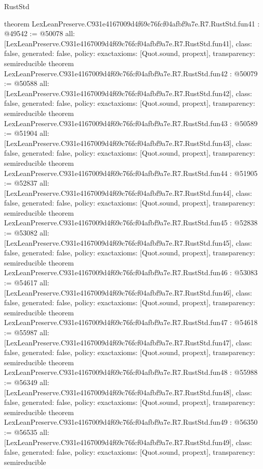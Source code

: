 \begin{lexlean}{RustStd}
\begin{coremodule}
{}
theorem LexLeanPreserve.C931e4167009d4f69c76fcf04afbf9a7e.R7.RustStd.fun41 : @49542 := @50078 {
  all: [LexLeanPreserve.C931e4167009d4f69c76fcf04afbf9a7e.R7.RustStd.fun41],
  class: false,
  generated: false,
  policy: exact{axioms: [Quot.sound, propext]},
  transparency: semireducible
}
theorem LexLeanPreserve.C931e4167009d4f69c76fcf04afbf9a7e.R7.RustStd.fun42 : @50079 := @50588 {
  all: [LexLeanPreserve.C931e4167009d4f69c76fcf04afbf9a7e.R7.RustStd.fun42],
  class: false,
  generated: false,
  policy: exact{axioms: [Quot.sound, propext]},
  transparency: semireducible
}
theorem LexLeanPreserve.C931e4167009d4f69c76fcf04afbf9a7e.R7.RustStd.fun43 : @50589 := @51904 {
  all: [LexLeanPreserve.C931e4167009d4f69c76fcf04afbf9a7e.R7.RustStd.fun43],
  class: false,
  generated: false,
  policy: exact{axioms: [Quot.sound, propext]},
  transparency: semireducible
}
theorem LexLeanPreserve.C931e4167009d4f69c76fcf04afbf9a7e.R7.RustStd.fun44 : @51905 := @52837 {
  all: [LexLeanPreserve.C931e4167009d4f69c76fcf04afbf9a7e.R7.RustStd.fun44],
  class: false,
  generated: false,
  policy: exact{axioms: [Quot.sound, propext]},
  transparency: semireducible
}
theorem LexLeanPreserve.C931e4167009d4f69c76fcf04afbf9a7e.R7.RustStd.fun45 : @52838 := @53082 {
  all: [LexLeanPreserve.C931e4167009d4f69c76fcf04afbf9a7e.R7.RustStd.fun45],
  class: false,
  generated: false,
  policy: exact{axioms: [Quot.sound, propext]},
  transparency: semireducible
}
theorem LexLeanPreserve.C931e4167009d4f69c76fcf04afbf9a7e.R7.RustStd.fun46 : @53083 := @54617 {
  all: [LexLeanPreserve.C931e4167009d4f69c76fcf04afbf9a7e.R7.RustStd.fun46],
  class: false,
  generated: false,
  policy: exact{axioms: [Quot.sound, propext]},
  transparency: semireducible
}
theorem LexLeanPreserve.C931e4167009d4f69c76fcf04afbf9a7e.R7.RustStd.fun47 : @54618 := @55987 {
  all: [LexLeanPreserve.C931e4167009d4f69c76fcf04afbf9a7e.R7.RustStd.fun47],
  class: false,
  generated: false,
  policy: exact{axioms: [Quot.sound, propext]},
  transparency: semireducible
}
theorem LexLeanPreserve.C931e4167009d4f69c76fcf04afbf9a7e.R7.RustStd.fun48 : @55988 := @56349 {
  all: [LexLeanPreserve.C931e4167009d4f69c76fcf04afbf9a7e.R7.RustStd.fun48],
  class: false,
  generated: false,
  policy: exact{axioms: [Quot.sound, propext]},
  transparency: semireducible
}
theorem LexLeanPreserve.C931e4167009d4f69c76fcf04afbf9a7e.R7.RustStd.fun49 : @56350 := @56535 {
  all: [LexLeanPreserve.C931e4167009d4f69c76fcf04afbf9a7e.R7.RustStd.fun49],
  class: false,
  generated: false,
  policy: exact{axioms: [Quot.sound, propext]},
  transparency: semireducible
}
\end{coremodule}
\end{lexlean}
